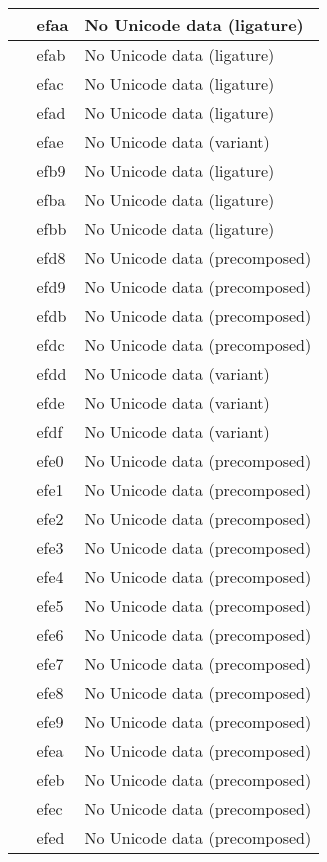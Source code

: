 \documentclass[12pt,letterpaper,openany]{book}
\begin{document}
\begin{center}
\begin{supertabular}{|m{0.25in}|m{0.5in}|m{4in}|}
			 & efaa & No Unicode data (ligature)\\\hline
			 & efab & No Unicode data (ligature)\\\hline
			 & efac & No Unicode data (ligature)\\\hline
			 & efad & No Unicode data (ligature)\\\hline
			 & efae & No Unicode data (variant)\\\hline
			 & efb9 & No Unicode data (ligature)\\\hline
			 & efba & No Unicode data (ligature)\\\hline
			 & efbb & No Unicode data (ligature)\\\hline
			 & efd8 & No Unicode data (precomposed)\\\hline
			 & efd9 & No Unicode data (precomposed)\\\hline
			 & efdb & No Unicode data (precomposed)\\\hline
			 & efdc & No Unicode data (precomposed)\\\hline
			 & efdd & No Unicode data (variant)\\\hline
			 & efde & No Unicode data (variant)\\\hline
			 & efdf & No Unicode data (variant)\\\hline
			 & efe0 & No Unicode data (precomposed)\\\hline
			 & efe1 & No Unicode data (precomposed)\\\hline
			 & efe2 & No Unicode data (precomposed)\\\hline
			 & efe3 & No Unicode data (precomposed)\\\hline
			 & efe4 & No Unicode data (precomposed)\\\hline
			 & efe5 & No Unicode data (precomposed)\\\hline
			 & efe6 & No Unicode data (precomposed)\\\hline
			 & efe7 & No Unicode data (precomposed)\\\hline
			 & efe8 & No Unicode data (precomposed)\\\hline
			 & efe9 & No Unicode data (precomposed)\\\hline
			 & efea & No Unicode data (precomposed)\\\hline
			 & efeb & No Unicode data (precomposed)\\\hline
			 & efec & No Unicode data (precomposed)\\\hline
			 & efed & No Unicode data (precomposed)\\\hline

\end{supertabular}
\end{center}
\end{document}
